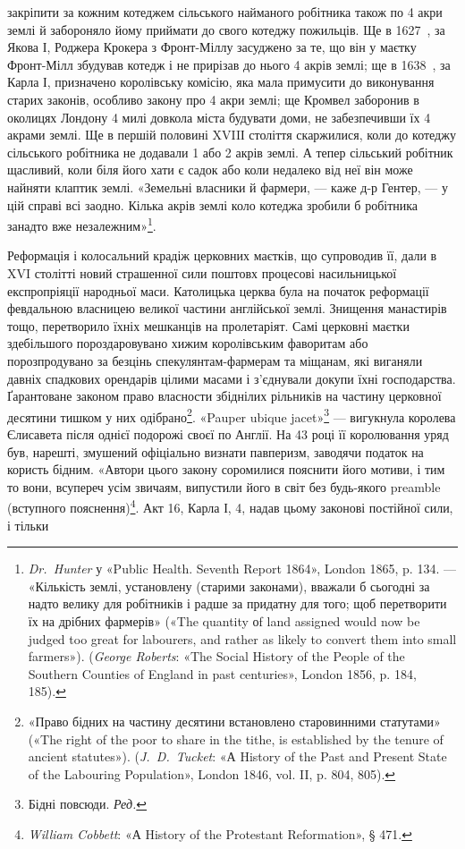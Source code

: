 \parcont{}  %
закріпити за кожним котеджем сільського найманого робітника
також по 4 акри землі й забороняло йому приймати до свого
котеджу пожильців. Ще в 1627~, за Якова І, Роджера Крокера
з Фронт-Міллу засуджено за те, що він у маєтку Фронт-Мілл
збудував котедж і не прирізав до нього 4 акрів землі; ще в 1638~,
за Карла І, призначено королівську комісію, яка мала примусити
до виконування старих законів, особливо закону про 4 акри
землі; ще Кромвел заборонив в околицях Лондону 4 милі довкола
міста будувати доми, не забезпечивши їх 4 акрами землі. Ще в
першій половині XVIIІ століття скаржилися, коли до котеджу
сільського робітника не додавали 1 або 2 акрів землі. А тепер
сільський робітник щасливий, коли біля його хати є садок або
коли недалеко від неї він може найняти клаптик землі. «Земельні
власники й фармери, — каже д-р Гентер, — у цій справі всі заодно.
Кілька акрів землі коло котеджа зробили б робітника
занадто вже незалежним»\footnote{
\emph{Dr.~Hunter} у «Public Health. Seventh Report 1864», London 1865,
p. 134. — «Кількість землі, установлену (старими законами), вважали б
сьогодні за надто велику для робітників і радше за придатну для того;
щоб перетворити їх на дрібних фармерів» («The quantity оf land assigned
would now be judged too great for labourers, and rather as likely to
convert them into small farmers»). (\emph{George Roberts}: «The Social History
of the People of the Southern Counties of England in past centuries», London
1856, p. 184, 185).
}.

Реформація і колосальний крадіж церковних маєтків, що
супроводив її, дали в XVI столітті новий страшенної сили поштовх
процесові насильницької експропріяції народньої маси.
Католицька церква була на початок реформації февдальною
власницею великої частини англійської землі. Знищення манастирів
тощо, перетворило їхніх мешканців на пролетаріят.
Самі церковні маєтки здебільшого пороздаровувано хижим королівським
фаворитам або порозпродувано за безцінь спекулянтам-фармерам
та міщанам, які виганяли давніх спадкових орендарів
цілими масами і з’єднували докупи їхні господарства. Ґарантоване
законом право власности збіднілих рільників на частину
церковної десятини тишком у них одібрано\footnote{
«Право бідних на частину десятини встановлено старовинними
статутами» («The right of the poor to share in the tithe, is established by
the tenure of ancient statutes»). (\emph{J.~D.~Tucket}: «А History of the Past
and Present State of the Labouring Population», London 1846, vol. II,
p. 804, 805).
}. «Pauper ubique
jacet»\footnote*{
Бідні повсюди. \emph{Ред.}
} — вигукнула королева Єлисавета після однієї подорожі
своєї по Англії. На 43 році її королювання уряд був, нарешті,
змушений офіціально визнати павперизм, заводячи податок на
користь бідним. «Автори цього закону соромилися пояснити
його мотиви, і тим то вони, всупереч усім звичаям, випустили
його в світ без будь-якого preamble (вступного пояснення)\footnote{
\emph{William Cobbett}: «А History of the Protestant Reformation», § 471.
}.
Акт 16, Карла І, 4, надав цьому законові постійної сили, і тільки
\parbreak{}  %
